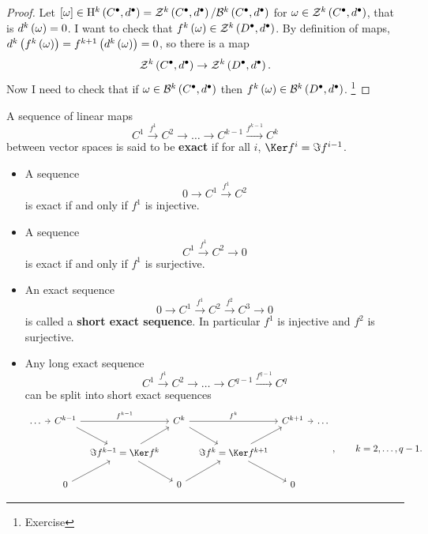 \begin{proof}
Let $ \sbr{\omega} \in \H^k\br{C^\bullet, d^\bullet} = \ZZZ^k\br{C^\bullet, d^\bullet} / \BBB^k\br{C^\bullet, d^\bullet} $ for $ \omega \in \ZZZ^k\br{C^\bullet, d^\bullet} $, that is $ d^k\br{\omega} = 0 $. I want to check that $ f^k\br{\omega} \in \ZZZ^k\br{D^\bullet, d^\bullet} $. By definition of maps, $ d^k\br{f^k\br{\omega}} = f^{k + 1}\br{d^k\br{\omega}} = 0 $, so there is a map
$$ \ZZZ^k\br{C^\bullet, d^\bullet} \to \ZZZ^k\br{D^\bullet, d^\bullet}. $$
Now I need to check that if $ \omega \in \BBB^k\br{C^\bullet, d^\bullet} $ then $ f^k\br{\omega} \in \BBB^k\br{D^\bullet, d^\bullet} $. \footnote{Exercise}
\end{proof}


\begin{definition}
A sequence of linear maps
$$ C^1 \xrightarrow{f^1} C^2 \to \dots \to C^{k - 1} \xrightarrow{f^{k - 1}} C^k $$
between vector spaces is said to be \textbf{exact} if for all $ i $, $ \Ker f^i = \Im f^{i - 1} $.
\end{definition}

\begin{example}
\hfill
\begin{itemize}
\item A sequence
$$ 0 \to C^1 \xrightarrow{f^1} C^2 $$
is exact if and only if $ f^1 $ is injective.
\item A sequence
$$ C^1 \xrightarrow{f^1} C^2 \to 0 $$
is exact if and only if $ f^1 $ is surjective.
\item An exact sequence
$$ 0 \to C^1 \xrightarrow{f^1} C^2 \xrightarrow{f^2} C^3 \to 0 $$
is called a \textbf{short exact sequence}. In particular $ f^1 $ is injective and $ f^2 $ is surjective.

\pagebreak

\item Any long exact sequence
$$ C^1 \xrightarrow{f^1} C^2 \to \dots \to C^{q - 1} \xrightarrow{f^{q - 1}} C^q $$
can be split into short exact sequences
$$
\begin{tikzcd}[column sep=tiny]
\dots \arrow{r} & C^{k - 1} \arrow{rr}{f^{k - 1}} \arrow{dr} & & C^k \arrow{rr}{f^k} \arrow{dr} & & C^{k + 1} \arrow{r} & \dots \\
& & \Im f^{k - 1} = \Ker f^k \arrow{ur} \arrow{dr} & & \Im f^k = \Ker f^{k + 1} \arrow{ur} \arrow{dr} & & \\
& 0 \arrow{ur} & & 0 \arrow{ur} & & 0 &
\end{tikzcd},
\qquad k = 2, \dots, q - 1. $$
\end{itemize}
\end{example}

